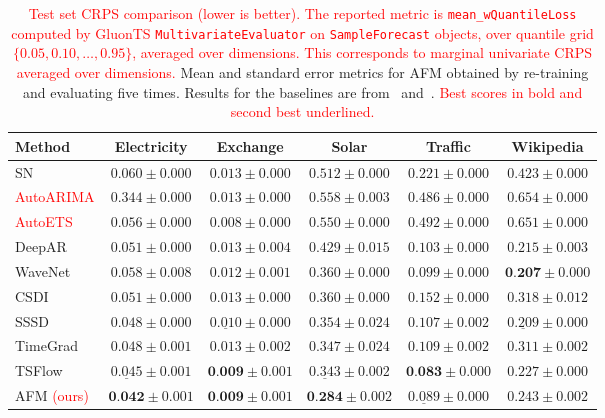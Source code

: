 \documentclass[a4paper,10pt,twocolumn,preprint,3p]{elsarticle}
\begin{document}
\begin{table}[!tbp]
  \centering
  \setlength{\tabcolsep}{4pt}
  \caption{\textcolor{red}{Test set CRPS comparison (lower is better). The reported metric is \texttt{mean\_wQuantileLoss} computed by GluonTS \texttt{MultivariateEvaluator} on \texttt{SampleForecast} objects, over quantile grid $\{0.05, 0.10, \ldots, 0.95\}$, averaged over dimensions. This corresponds to marginal univariate CRPS averaged over dimensions.} Mean and standard error metrics for AFM obtained by re-training and evaluating five times. Results for the baselines are from~\citep{Kerrigan2024Flow} and~\citep{rasul2021autoregressive}. \textcolor{red}{Best scores in bold and second best underlined.}}
  \label{tab:forecasting}
\begin{small}
  \begin{tabular}{lccccc}
    \toprule
    Method & Electricity & Exchange & Solar & Traffic & Wikipedia \\
    \midrule
    SN               & $0.060 \pm 0.000$ & $0.013 \pm 0.000$ & $0.512 \pm 0.000$ & $0.221 \pm 0.000$ & $0.423 \pm 0.000$ \\
    \textcolor{red}{AutoARIMA}            & $0.344 \pm 0.000$ & $0.013 \pm 0.000$ & $0.558 \pm 0.003$ & $0.486 \pm 0.000$ & $0.654 \pm 0.000$ \\
    \textcolor{red}{AutoETS}              & $0.056 \pm 0.000$ & $0.008 \pm 0.000$ & $0.550 \pm 0.000$ & $0.492 \pm 0.000$ & $0.651 \pm 0.000$ \\
    DeepAR           & $0.051 \pm 0.000$ & $0.013 \pm 0.004$ & $0.429 \pm 0.015$ & $0.103 \pm 0.000$ & $0.215 \pm 0.003$ \\
    WaveNet          & $0.058 \pm 0.008$ & $0.012 \pm 0.001$ & $0.360 \pm 0.000$ & $0.099 \pm 0.000$ & $\textbf{0.207} \pm 0.000$ \\
    CSDI             & $0.051 \pm 0.000$ & $0.013 \pm 0.000$ & $0.360 \pm 0.000$ & $0.152 \pm 0.000$ & $0.318 \pm 0.012$ \\
    SSSD             & $0.048 \pm 0.000$ & $\underline{0.010} \pm 0.000$ & $0.354 \pm 0.024$ & $0.107 \pm 0.002$ & $\underline{0.209} \pm 0.000$ \\
    TimeGrad         & $0.048 \pm 0.001$ & $0.013 \pm 0.002$ & $0.347 \pm 0.024$ & $0.109 \pm 0.002$ & $0.311 \pm 0.002$ \\
    TSFlow           & $\underline{0.045} \pm 0.001$ & $\textbf{0.009} \pm 0.001$ & $\underline{0.343} \pm 0.002$ & $\textbf{0.083} \pm 0.000$ & $0.227 \pm 0.000$ \\
    AFM \textcolor{red}{(ours)}       & $\textbf{0.042} \pm 0.001$ & $\textbf{0.009} \pm 0.001$ & $\textbf{0.284} \pm 0.002$ & $\underline{0.089} \pm 0.000$ & $0.243 \pm 0.002$ \\
    \bottomrule
  \end{tabular}
  \end{small}
\end{table}
\end{document}
